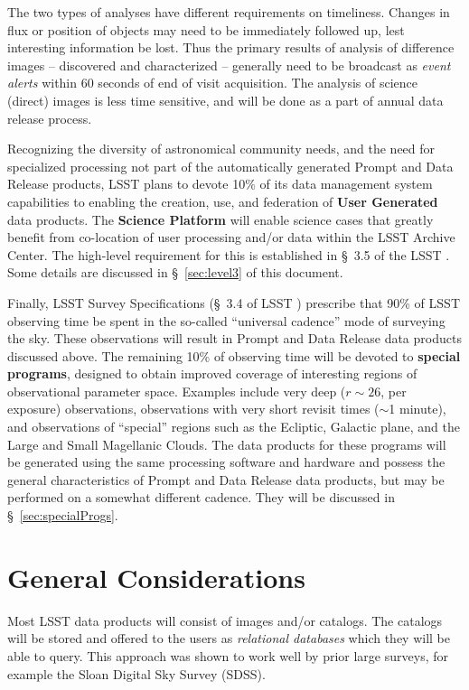 \documentclass[SE,lsstdraft,toc]{lsstdoc}
\begin{document}
The two types of analyses have different requirements on timeliness. Changes in flux or position of objects may need to be immediately followed up, lest interesting information be lost. Thus the primary results of analysis of difference images -- discovered and characterized \DIASources{} -- generally need to be broadcast as \emph{event alerts} within 60 seconds of end of visit acquisition. The analysis of science (direct) images is less time sensitive, and will be done as a part of annual data release process.

Recognizing the diversity of astronomical community needs, and the need for specialized processing not part of the automatically generated Prompt and Data Release products, LSST plans to devote 10\% of its data management system capabilities to enabling the creation, use, and federation of \textbf{User Generated} data products. The \textbf{Science Platform}  will enable science cases that greatly benefit from co-location of user processing and/or data within the LSST Archive Center. The high-level requirement for this is established in \S~3.5 of the LSST \SRD. Some  details are discussed in \S~\ref{sec:level3} of this document.

Finally, LSST Survey Specifications (\S~3.4 of LSST \SRD) prescribe that 90\% of LSST observing time be spent in the so-called ``universal cadence'' mode of surveying the sky. These observations will result in Prompt and Data Release data products discussed above. The remaining 10\% of observing time will be devoted to \textbf{special programs}, designed to obtain improved coverage of interesting regions of observational parameter space. Examples include very deep ($r\sim26$, per exposure) observations, observations with very short revisit times ($\sim$1 minute), and observations of ``special'' regions such as the Ecliptic, Galactic plane, and the Large and Small Magellanic Clouds. The data products for these programs will be generated using the same processing software and hardware and possess the general characteristics of Prompt and Data Release data products, but may be performed on a somewhat different cadence. They will be discussed in \S~\ref{sec:specialProgs}.


\section{General Considerations}

Most LSST data products will consist of images and/or catalogs. The catalogs will be stored and offered to the users as \emph{relational databases} which they will be able to query. This approach was shown to work well by prior large surveys, for example the Sloan Digital Sky Survey (SDSS).
\end{document}
